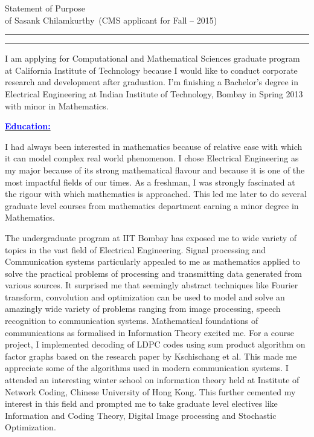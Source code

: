 \documentclass[11pt]{article}
\newcommand{\soptitle}{Statement of Purpose}
\newcommand{\yourname}{Sasank Chilamkurthy}
\newcommand{\statement}[1]{\par\medskip
  \underline{\textcolor{blue}{\textbf{#1:}}}\space
}
\begin{document}
\begin{center}
\LARGE\soptitle\\
\large of \yourname\ (CMS applicant for Fall -- 2015)
\end{center}

\hrule
\vspace{1pt}
\hrule height 1pt

\bigskip
I am applying for Computational and Mathematical Sciences graduate program at California Institute of Technology because I would like to conduct corporate research and development after graduation. 
I'm finishing a Bachelor's degree in Electrical Engineering at Indian Institute of Technology, Bombay in Spring 2013
with minor in Mathematics.
\statement{Education}
I had always been interested in mathematics because of relative ease with which it can model complex real world phenomenon. 
I chose Electrical Engineering as my major because of its strong mathematical flavour and because it is one of the most impactful fields of our times. 
As a freshman, I was strongly fascinated at the rigour with which mathematics is approached. 
This led me later to do several graduate level courses from mathematics department earning a minor degree in Mathematics. 

The undergraduate program at IIT Bombay has exposed me to wide variety of topics in the vast field of Electrical Engineering. 
Signal processing and Communication systems particularly appealed to me as mathematics applied to solve the practical problems of processing and transmitting data generated from various sources. 
It surprised me that seemingly abstract techniques like Fourier transform, convolution and optimization can be used to model and solve an amazingly wide variety of problems ranging from image processing, speech recognition to communication systems.
Mathematical foundations of communications as formalised in Information Theory excited me. 
For a course project, I implemented decoding of LDPC codes using sum product algorithm on factor graphs based on the research paper by Kschischang et al. 
This made me appreciate some of the algorithms used in modern communication systems. 
I attended an interesting winter school on information theory held at Institute of Network Coding, Chinese University of Hong Kong. 
This further cemented my interest in this field and prompted me to take graduate level electives like Information and Coding Theory, Digital Image processing and Stochastic Optimization.
\end{document}
